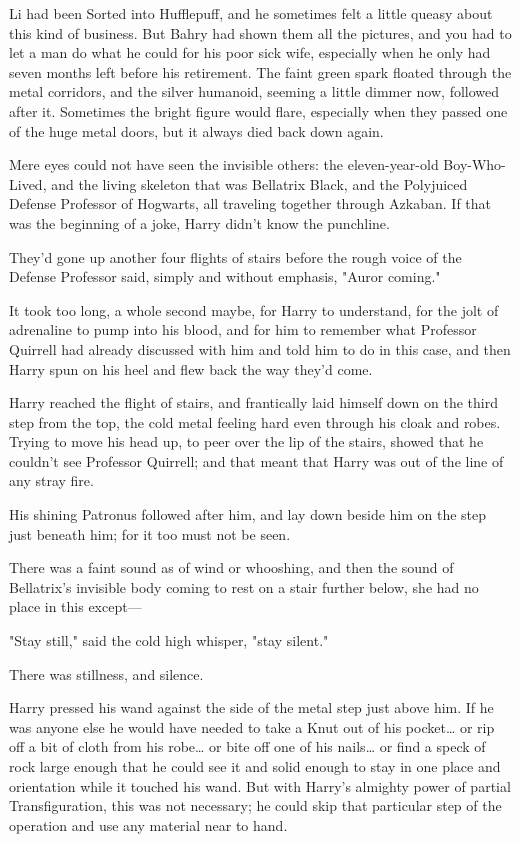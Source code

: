 Li had been Sorted into Hufflepuff, and he sometimes felt a little queasy about 
this kind of business. But Bahry had shown them all the pictures, and you had 
to let a man do what he could for his poor sick wife, especially when he only 
had seven months left before his retirement.
\sbreak
The faint green spark floated through the metal corridors, and the silver 
humanoid, seeming a little dimmer now, followed after it. Sometimes the bright 
figure would flare, especially when they passed one of the huge metal doors, 
but it always died back down again.

Mere eyes could not have seen the invisible others: the eleven-year-old 
Boy-Who-Lived, and the living skeleton that was Bellatrix Black, and the 
Polyjuiced Defense Professor of Hogwarts, all traveling together through 
Azkaban. If that was the beginning of a joke, Harry didn't know the punchline.

They'd gone up another four flights of stairs before the rough voice of the 
Defense Professor said, simply and without emphasis, "Auror coming."

It took too long, a whole second maybe, for Harry to understand, for the jolt 
of adrenaline to pump into his blood, and for him to remember what Professor 
Quirrell had already discussed with him and told him to do in this case, and 
then Harry spun on his heel and flew back the way they'd come.

Harry reached the flight of stairs, and frantically laid himself down on the 
third step from the top, the cold metal feeling hard even through his cloak and 
robes. Trying to move his head up, to peer over the lip of the stairs, showed 
that he couldn't see Professor Quirrell; and that meant that Harry was out of 
the line of any stray fire.

His shining Patronus followed after him, and lay down beside him on the step 
just beneath him; for it too must not be seen.

There was a faint sound as of wind or whooshing, and then the sound of 
Bellatrix's invisible body coming to rest on a stair further below, she had no 
place in this except---

"Stay still," said the cold high whisper, "stay silent."

There was stillness, and silence.

Harry pressed his wand against the side of the metal step just above him. If he 
was anyone else he would have needed to take a Knut out of his pocket{\ldots} 
or rip off a bit of cloth from his robe{\ldots} or bite off one of his 
nails{\ldots} or find a speck of rock large enough that he could see it and 
solid enough to stay in one place and orientation while it touched his wand. 
But with Harry's almighty power of partial Transfiguration, this was not 
necessary; he could skip that particular step of the operation and use any 
material near to hand.

